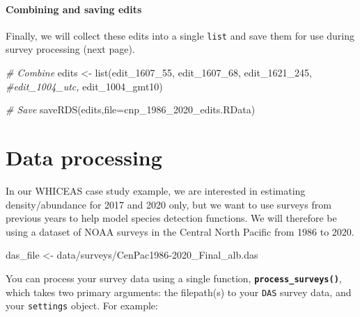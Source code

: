 \documentclass[
]{book}
\newenvironment{Shaded}{\begin{snugshade}}{\end{snugshade}}
\newcommand{\AttributeTok}[1]{\textcolor[rgb]{0.77,0.63,0.00}{#1}}
\newcommand{\CommentTok}[1]{\textcolor[rgb]{0.56,0.35,0.01}{\textit{#1}}}
\newcommand{\FunctionTok}[1]{\textcolor[rgb]{0.00,0.00,0.00}{#1}}
\newcommand{\NormalTok}[1]{#1}
\newcommand{\OtherTok}[1]{\textcolor[rgb]{0.56,0.35,0.01}{#1}}
\newcommand{\StringTok}[1]{\textcolor[rgb]{0.31,0.60,0.02}{#1}}
\begin{document}
\hypertarget{combining-and-saving-edits}{%
\subsubsection*{Combining and saving edits}\label{combining-and-saving-edits}}

Finally, we will collect these edits into a single \texttt{list} and save them for use during survey processing (next page).

\begin{Shaded}
\begin{Highlighting}[]
\CommentTok{\# Combine}
\NormalTok{edits }\OtherTok{\textless{}{-}} \FunctionTok{list}\NormalTok{(edit\_1607\_55,}
\NormalTok{              edit\_1607\_68,}
\NormalTok{              edit\_1621\_245,}
              \CommentTok{\#edit\_1004\_utc,}
\NormalTok{              edit\_1004\_gmt10)}

\CommentTok{\# Save}
\FunctionTok{saveRDS}\NormalTok{(edits,}\AttributeTok{file=}\StringTok{\textquotesingle{}cnp\_1986\_2020\_edits.RData\textquotesingle{}}\NormalTok{)}
\end{Highlighting}
\end{Shaded}

\hypertarget{processing}{%
\chapter{Data processing}\label{processing}}

In our WHICEAS case study example, we are interested in estimating density/abundance for 2017 and 2020 only, but we want to use surveys from previous years to help model species detection functions. We will therefore be using a dataset of NOAA surveys in the Central North Pacific from 1986 to 2020.

\begin{Shaded}
\begin{Highlighting}[]
\NormalTok{das\_file }\OtherTok{\textless{}{-}} \StringTok{\textquotesingle{}data/surveys/CenPac1986{-}2020\_Final\_alb.das\textquotesingle{}}
\end{Highlighting}
\end{Shaded}

You can process your survey data using a single function, \textbf{\texttt{process\_surveys()}}, which takes two primary arguments: the filepath(s) to your \texttt{DAS} survey data, and your \texttt{settings} object. For example:
\end{document}

